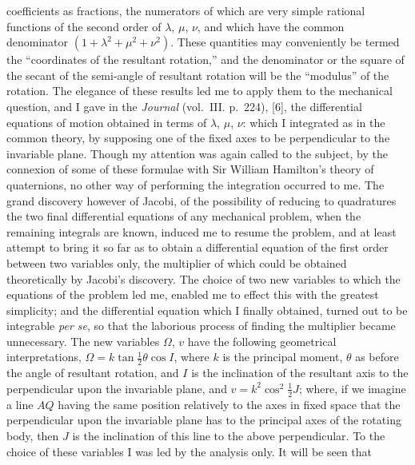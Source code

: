 \documentclass[11pt]{article}
\begin{document}
\newpage
\setcounter{page}{238}

coefficients as fractions, the numerators of which are very simple rational functions of
the second order of $\lambda$, $\mu$, $\nu$, and which have the common denominator
$(1+\lambda^2+\mu^2+\nu^2)$. These quantities may conveniently be termed the
``coordinates of the resultant rotation,'' and the denominator or the square of the
secant of the semi-angle of resultant rotation will be the ``modulus'' of the rotation.
The elegance of these results led me to apply them to the mechanical question, and I
gave in the \textit{Journal} (vol.~III. p.~224), [6], the differential equations of motion
obtained in terms of $\lambda$, $\mu$, $\nu$: which I integrated as in the common
theory, by supposing one of the fixed axes to be perpendicular to the invariable plane.
Though my attention was again called to the subject, by the connexion of some of these
formulae with Sir William Hamilton's theory of quaternions, no other way of performing
the integration occurred to me. The grand discovery however of Jacobi, of the
possibility of reducing to quadratures the two final differential equations of any
mechanical problem, when the remaining integrals are known, induced me to resume the
problem, and at least attempt to bring it so far as to obtain a differential equation of
the first order between two variables only, the multiplier of which could be obtained
theoretically by Jacobi's discovery. The choice of two new variables to which the
equations of the problem led me, enabled me to effect this with the greatest simplicity;
and the differential equation which I finally obtained, turned out to be integrable
\textit{per se}, so that the laborious process of finding the multiplier became unnecessary.
The new variables $\Omega$, $v$ have the following geometrical interpretations,
$\Omega=k\tan\tfrac12\theta\cos I$, where $k$ is the principal moment, $\theta$ as
before the angle of resultant rotation, and $I$ is the inclination of the resultant axis
to the perpendicular upon the invariable plane, and $v=k^2\cos^2\tfrac12 J$; where, if
we imagine a line $AQ$ having the same position relatively to the axes in fixed space
that the perpendicular upon the invariable plane has to the principal axes of the
rotating body, then $J$ is the inclination of this line to the above perpendicular. To
the choice of these variables I was led by the analysis only. It will be seen that
\end{document}
